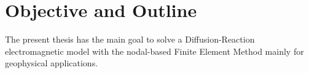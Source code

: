 \documentclass[../Dissertation]{subfiles}
\begin{document}
\section{Objective and Outline}\label{s:chp1_objective}

The present thesis has the main goal to solve a Diffusion-Reaction electromagnetic model with the nodal-based Finite Element Method mainly for geophysical applications. 
\end{document}
